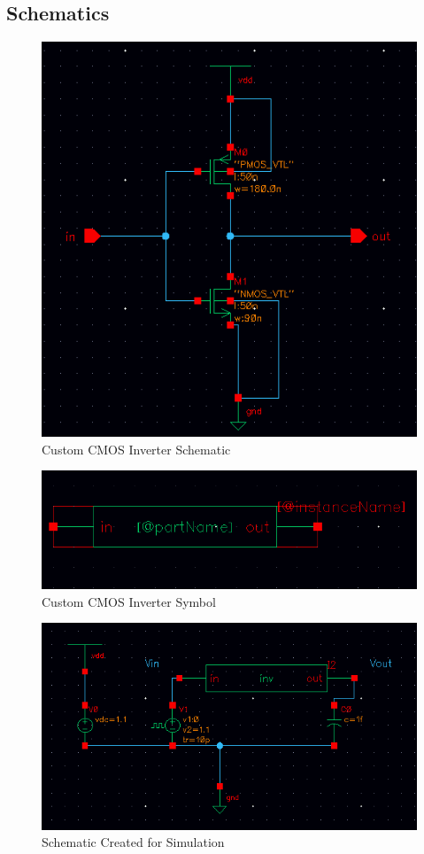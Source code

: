 \documentclass[12pt]{article}
\begin{document}
\subsection{Schematics}
\begin{figure}[H]
\centering
\includegraphics[width=0.5\linewidth]{custom_inverter}
\caption{Custom CMOS Inverter Schematic}
\label{fig:custom_inverter}
\end{figure}

\begin{figure}[H]
\centering
\includegraphics[width=0.7\linewidth]{custom_symbol}
\caption{Custom CMOS Inverter Symbol}
\label{fig:custom_symbol}
\end{figure}

\begin{figure}[H]
\centering
\includegraphics[width=0.7\linewidth]{lab2_schematic}
\caption{Schematic Created for Simulation}
\label{fig:lab2_schematic}
\end{figure}
\end{document}
